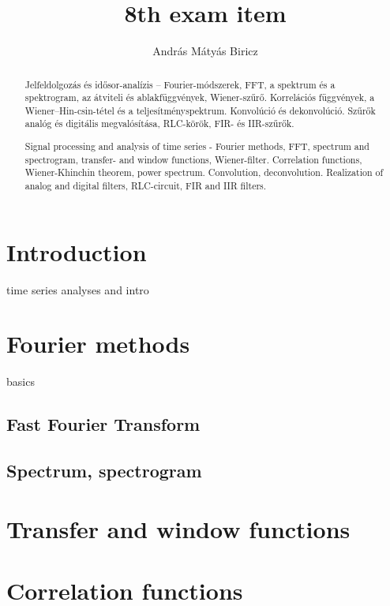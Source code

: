 \documentclass[12pt]{article}
\theoremstyle{plain}
\begin{document}
\title{8th exam item}
\author{András Mátyás Biricz}

\maketitle


\newpage
\begin{abstract}
    Jelfeldolgozás és idősor-analízis – Fourier-módszerek, FFT, a spektrum és a spektrogram, az átviteli és ablakfüggvények, Wiener-szűrő. Korrelációs függvények, a Wiener–Hin-csin-tétel és a teljesítményspektrum. Konvolúció és dekonvolúció. Szűrők analóg és digitális megvalósítása, RLC-körök, FIR- és IIR-szűrők.

	Signal processing and analysis of time series - Fourier methods, FFT, spectrum and spectrogram, transfer- and window functions, Wiener-filter. Correlation functions, Wiener-Khinchin theorem, power spectrum. Convolution, deconvolution. Realization of analog and digital filters, RLC-circuit, FIR and IIR filters. 

\end{abstract}

\section{Introduction}

time series analyses and intro


\section{Fourier methods}

basics

\subsection{Fast Fourier Transform}


\subsection{Spectrum, spectrogram}


\section{Transfer and window functions}



\section{Correlation functions}
\end{document}
